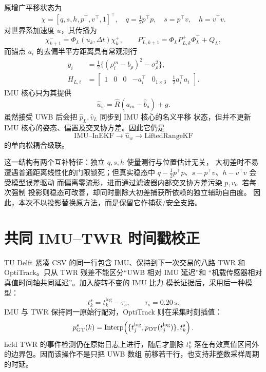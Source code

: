 \documentclass[11pt,a4paper]{ctexart}
\begin{document}
原增广平移状态为
\begin{equation}
\chi=[q,s,h,p^\top,v^\top,1]^\top,\quad
q=\tfrac12p^\top p,\quad s=p^\top v,\quad h=v^\top v .
\end{equation}
对世界系加速度 $u$，其传播为
\begin{equation}
\chi_{k+1}^{-}=\Phi_L(u_k,\Delta t)\chi_k^+,\qquad
P_{L,k+1}^{-}=\Phi_LP_{L,k}^{+}\Phi_L^\top+Q_L ,
\end{equation}
而锚点 $a_i$ 的去偏半平方距离具有常观测行
\begin{align}
y_i&=\tfrac12\{(\rho_i^m-b_\rho)^2-\sigma_\rho^2\},\\
H_{L,i}&=
\begin{bmatrix}1&0&0&-a_i^\top&0_{1\times3}&
\tfrac12a_i^\top a_i\end{bmatrix}.
\end{align}
IMU 核心只为其提供
\begin{equation}
\hat u_w=\hat R(a_m-\hat b_a)+g.
\end{equation}
虽然接受 UWB 后会把 $\hat p_L,\hat v_L$ 同步到 IMU 核心的名义平移
状态，但并不更新 IMU 核心的姿态、偏置及交叉协方差。因此它仍是
\begin{equation}
\text{IMU--InEKF}\longrightarrow\hat u_w
\longrightarrow\text{LiftedRangeKF}
\end{equation}
的单向松耦合级联。

这一结构有两个互补特征：独立 $q,s,h$ 使量测行与位置估计无关，
大初差时不易遭遇普通距离线性化的门限锁死；但真实稳态中
$q-\frac12p^\top p$、$s-p^\top v$、$h-v^\top v$ 会受模型误差驱动
而偏离零流形，进而通过滤波器内部交叉协方差污染 $p,v$。若每次强制
投影则稳态可改善，却同时删除大初差捕获所依赖的独立辅助自由度。
因此，本次不以投影替换原方法，而是保留它作捕获/安全支路。

\section{共同 IMU--TWR 时间戳校正}

TU Delft 紧凑 CSV 的同一行包含 IMU、保持到下一次交易的八路 TWR
和 OptiTrack。只从 TWR 残差不能区分``UWB 相对 IMU 延迟''和
``机载传感器相对真值时间轴共同延迟''。加入旋转不变的 IMU 比力
模长证据后，采用后一种模型：
\begin{equation}
t_k^s=t_k^{\log}-\tau_s,\qquad \tau_s=0.20~\mathrm{s}.
\label{eq:common-delay}
\end{equation}
IMU 与 TWR 保持同一原始行配对，OptiTrack 则在采集时刻插值：
\begin{equation}
p_{\rm GT}^s(k)=
\operatorname{Interp}\!\left(
\{t_j^{\log},p_{\rm OT}(t_j^{\log})\},t_k^s\right).
\end{equation}
held TWR 的事件检测仍在原始日志上进行，随后才删除
$t_k^s$ 落在有效真值区间外的边界包。因而该操作不是只把 UWB 数组
前移若干行，也支持非整数采样周期的时延。
\end{document}
